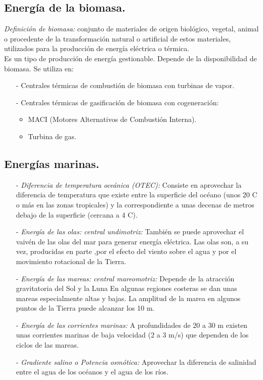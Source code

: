 			\subsection{Energía de la biomasa.}
				\textit{Definición de biomasa:} conjunto de materiales de origen biológico, vegetal, animal o procedente de
				la transformación natural o artificial de estos materiales, utilizados para la producción de energía
				eléctrica o térmica.\\
				\indent Es un tipo de producción de energía gestionable. Depende de la disponibilidad de biomasa. Se utiliza en:	
				\begin{itemize}
					\item[-] Centrales térmicas de combustión de biomasa con turbinas de vapor.
					\item[-] Centrales térmicas de gasificación de biomasa con cogeneración:
					\begin{itemize}
						\item MACI (Motores Alternativos de Combustión Interna).
						\item Turbina de gas.
					\end{itemize}
				\end{itemize}
				
			\subsection{Energías marinas.}
				\begin{itemize}
					\item[-] \textit{Diferencia de temperatura oceánica (OTEC):} 
						Consiste en aprovechar la diferencia de temperatura que existe entre la superficie del océano (unos 20 \textdegree C o más en las zonas tropicales) y la correspondiente a unas decenas de metros debajo de la superficie (cercana a 4 \textdegree C).
					\item[-] \textit{Energía de las olas: central undimotriz:}
						También se puede aprovechar el vaivén de las olas del mar para generar energía eléctrica. Las olas son, a
						su vez, producidas en parte ,por el efecto del viento sobre el agua y por el movimiento rotacional de la Tierra.
					\item[-] \textit{Energía de las mareas: central mareomotriz:}
						Depende de la atracción gravitatoria del Sol y la Luna En algunas regiones costeras se dan unas mareas
						especialmente altas y bajas. La amplitud de la marea en algunos puntos de la Tierra puede alcanzar los 10 m.
					\item[-] \textit{Energía de las corrientes marinas:}
						A profundidades de 20 a 30 m existen unas corrientes marinas de baja velocidad (2 a 3 m/s) que dependen de
						los ciclos de las mareas.
					\item[-] \textit{Gradiente salino o Potencia osmótica:}
						Aprovechar la diferencia de salinidad entre el agua de los océanos y el agua de los ríos.
				\end{itemize}
				
